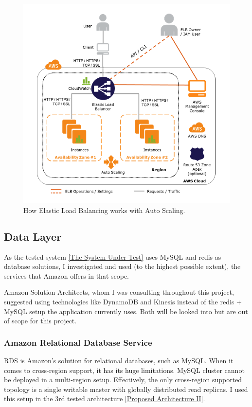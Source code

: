 \documentclass{uvamscse}
\begin{document}
\begin{figure}[H]
\centering
\includegraphics[scale=0.5]{elbautoscale}
\caption{How Elastic Load Balancing works with Auto Scaling.}
\label{figure:elbautoscale}
\end{figure}

\subsection{Data Layer}
As the tested system \ref{The System Under Test} uses MySQL and redis as database solutions, I investigated and used (to the highest possible extent), the services that Amazon offers in that scope.

Amazon Solution Architects, whom I was consulting throughout this project, suggested using technologies like DynamoDB and Kinesis instead of the redis + MySQL setup the application currently uses. Both will be looked into but are out of scope for this project.

\subsubsection{Amazon Relational Database Service}

RDS is Amazon's solution for relational databases, such as MySQL. When it comes to cross-region support, it has its huge limitations. MySQL cluster cannot be deployed in a multi-region setup. Effectively, the only cross-region supported topology is a single writable master with globally distributed read replicas. I used this setup in the 3rd tested architecture \ref{Proposed Architecture II}.
\end{document}
